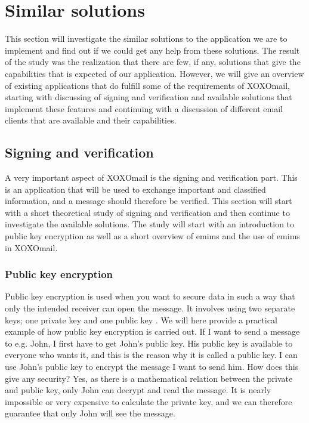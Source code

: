 

\section{Similar solutions}

This section will investigate the similar solutions to the application we are to implement and find out if we could get any help from these solutions. The result of the study was the realization that there are few, if any, solutions that give the capabilities that is expected of our application. However, we will give an overview of existing applications that do fulfill some of the requirements of XOXOmail, starting with discussing of signing and verification and available solutions that implement these features and continuing with a discussion of different email clients that are available and their capabilities.

\subsection{Signing and verification}

A very important aspect of XOXOmail is the signing and verification part. This is an application that will be used to exchange important and classified information, and a message should therefore be verified. This section will start with a short theoretical study of signing and verification and then continue to investigate the available solutions. The study will start with an introduction to public key encryption as well as a short overview of \gls{emims} and the use of \gls{emims} in XOXOmail.

\subsubsection{Public key encryption}
Public key encryption is used when you want to secure data in such a way that only the intended receiver can open the message. It involves using two separate keys; one private key and one public key \cite{bib:pke}. We will here provide a practical example of how public key encryption is carried out.
\newline
\newline
If I want to send a message to e.g. John, I first have to get John's public key. His public key is available to everyone who wants it, and this is the reason why it is called a public key. I can use John's public key to encrypt the message I want to send him. How does this give any security? Yes, as there is a mathematical relation between the private and public key, only John can decrypt and read the message. It is nearly impossible or very expensive to calculate the private key, and we can therefore guarantee that only John will see the message.


